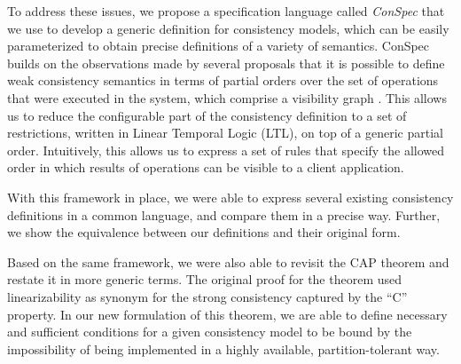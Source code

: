 \documentclass[journal,compsoc]{IEEEtran}
\begin{document}
To address these issues, we propose a specification language called
\emph{ConSpec} that  we use to develop a generic definition for consistency models, which can
be easily parameterized to obtain precise definitions of a variety of
semantics. ConSpec builds on the observations made by several proposals
that it is possible to define weak consistency semantics in terms of
partial orders over the set of operations that were executed in the
system, which comprise a visibility graph
\cite{Li:2012:MGS:2387880.2387906, Gotsman:2016:CIS:2837614.2837625, cheng-papoc}. This allows us to reduce
the configurable part of the consistency definition to a set of restrictions,
written in Linear Temporal Logic (LTL), on top of a generic partial order.
Intuitively, this allows us to express a set of rules that specify the allowed order in which results of operations can be visible to a client application.


With this framework in place, we were able to express several existing
consistency definitions in a common language, and compare them in a precise
way. Further, we show the equivalence between our definitions and  their original form. %

Based on the same framework, we were also able to revisit the CAP theorem \cite{brew:cap, Gilbert:2002:BCF:564585.564601} and restate it in more generic terms. The original proof for the theorem used linearizability as synonym for the strong consistency captured by the ``C'' property. In our new formulation of this theorem, we are able to define necessary and sufficient conditions for a given consistency model to be bound by the impossibility of being implemented in a highly available, partition-tolerant way.
\end{document}
